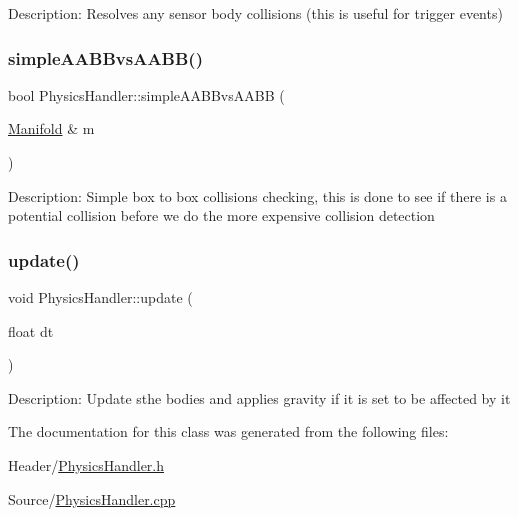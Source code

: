 Description\+: Resolves any sensor body collisions (this is useful for trigger events) \mbox{\label{class_physics_handler_aefa13520fd0f2a95d03e729aac275c86}} 
\subsubsection{\texorpdfstring{simpleAABBvsAABB()}{simpleAABBvsAABB()}}
{\footnotesize\ttfamily bool Physics\+Handler\+::simple\+A\+A\+B\+Bvs\+A\+A\+BB (\begin{DoxyParamCaption}\item[{\mbox{\hyperlink{struct_physics_handler_1_1_manifold}{Manifold}} \&}]{m }\end{DoxyParamCaption})\hspace{0.3cm}{\ttfamily [static]}}

Description\+: Simple box to box collisions checking, this is done to see if there is a potential collision before we do the more expensive collision detection \mbox{\label{class_physics_handler_aae72efd60617fe4f99f0973245834419}} 
\subsubsection{\texorpdfstring{update()}{update()}}
{\footnotesize\ttfamily void Physics\+Handler\+::update (\begin{DoxyParamCaption}\item[{float}]{dt }\end{DoxyParamCaption})\hspace{0.3cm}{\ttfamily [static]}}

Description\+: Update sthe bodies and applies gravity if it is set to be affected by it 

The documentation for this class was generated from the following files\+:\begin{DoxyCompactItemize}
\item 
Header/\mbox{\hyperlink{_physics_handler_8h}{Physics\+Handler.\+h}}\item 
Source/\mbox{\hyperlink{_physics_handler_8cpp}{Physics\+Handler.\+cpp}}\end{DoxyCompactItemize}
